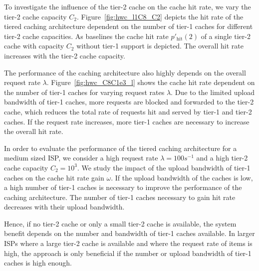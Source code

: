 To investigate the influence of the tier-2 cache on the cache hit rate, we vary the tier-2 cache capacity $C_2$.
Figure~\ref{fig:hwc_l1C8_C2} depicts the hit rate of the tiered caching architecture dependent on the number of tier-1 caches for different tier-2 cache capacities.
As baselines the cache hit rate $p'_\text{hit}(2)$ of a single tier-2 cache with capacity $C_2$ without tier-1 support is depicted.
The overall hit rate increases with the tier-2 cache capacity.

The performance of the caching architecture also highly depends on the overall request rate $\lambda$.
Figure~\ref{fig:hwc_C8C1e3_l} shows the cache hit rate dependent on the number of tier-1 caches for varying request rates $\lambda$.
Due to the limited upload bandwidth of tier-1 caches, more requests are blocked and forwarded to the tier-2 cache, which reduces the total rate of requests hit and served by tier-1 and tier-2 caches.
If the request rate increases, more tier-1 caches are necessary to increase the overall hit rate.

In order to evaluate the performance of the tiered caching architecture for a medium sized ISP, we consider a high request rate $\lambda=100s^{-1}$ and a high tier-2 cache capacity $C_2=10^3$.
We study the impact of the upload bandwidth of tier-1 caches on the cache hit rate gain $\omega$.
If the upload bandwidth of the caches is low, a high number of tier-1 caches is necessary to improve the performance of the caching architecture.
The number of tier-1 caches necessary to gain hit rate decreases with their upload bandwidth.

Hence, if no tier-2 cache or only a small tier-2 cache is available, the system benefit depends on the number and bandwidth of tier-1 caches available.
In larger ISPs where a large tier-2 cache is available and where the request rate of items is high, the approach is only beneficial if the number or upload bandwidth of tier-1 caches is high enough.

